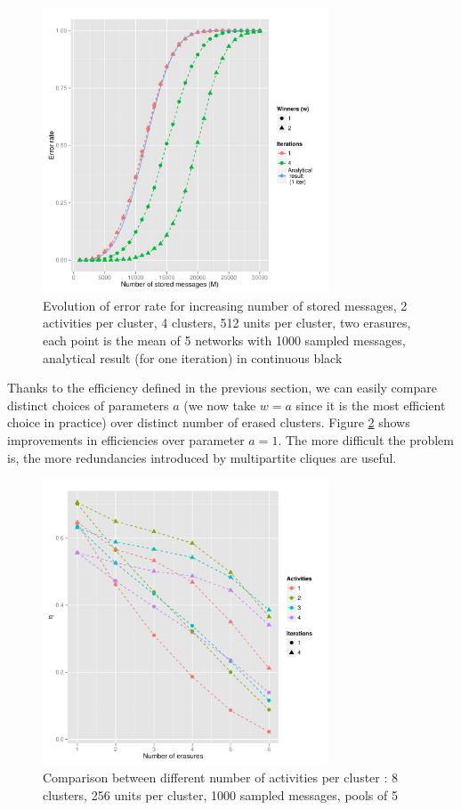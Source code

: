 \documentclass[english,10pt,twocolumn]{IEEEtran}
\theoremstyle{definition}
\begin{document}
		\begin{figure}[!htb]
		\includegraphics[width=8.5cm]{Courbes/fig3c4l512e2a2} %
		\caption{Evolution of error rate for increasing number of stored messages, 2 activities per cluster, 4 clusters, 512 units per cluster, two erasures, each point is the mean of 5 networks with 1000 sampled messages, analytical result (for one iteration) in continuous black}
			\label{erasuresth}
		\end{figure}		
		
		Thanks to the efficiency defined in the previous section, we can easily compare distinct choices of parameters $a$ (we now take $w = a$ since it is the most efficient choice in practice) over distinct number of erased clusters. Figure \ref{comperth} shows improvements in efficiencies over parameter $a =1$. The more difficult the problem is, the more redundancies introduced by multipartite cliques are useful.
		
		\begin{figure}[!htb]
		\includegraphics[width=8.5cm]{Courbes/5portant_erasures_c8l256}
		\caption{Comparison between different number of activities per cluster :  8 clusters, 256 units per cluster, 1000 sampled messages, pools of 5}
		\label{comperth}
	\end{figure}
%	
	
\end{document}
